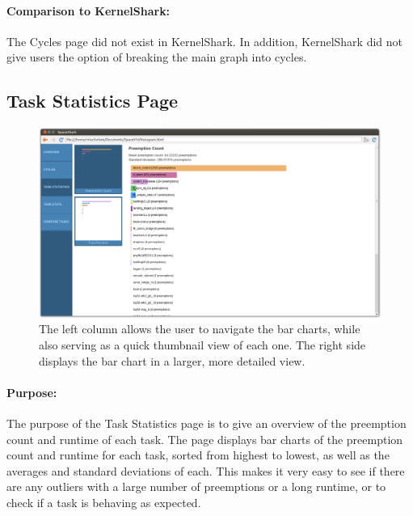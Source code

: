 \documentclass{hmcclinic}
\begin{document}
\paragraph{Comparison to KernelShark:}
    The Cycles page did not exist in KernelShark. In addition, KernelShark did not give users the option of breaking the main graph into cycles.
    
  
  \subsection{Task Statistics Page} %

  \begin{figure}[H]
  \includegraphics[width=5in]{task-statistics-page.png}
  \caption{The left column allows the user to navigate the bar charts, while
    also serving as a quick thumbnail view of each one. The right side displays
  the bar chart in a larger, more detailed view.}
  \end{figure}

\paragraph{Purpose:}
The purpose of the Task Statistics page is to give an overview of the preemption count and runtime of each task. The page displays bar charts of the preemption count and runtime for each task, sorted from highest to lowest, as well as the averages and standard deviations of each. This makes it very easy to see if there are any outliers with a large number of preemptions or a long runtime, or to check if a task is behaving as expected.
\end{document}
